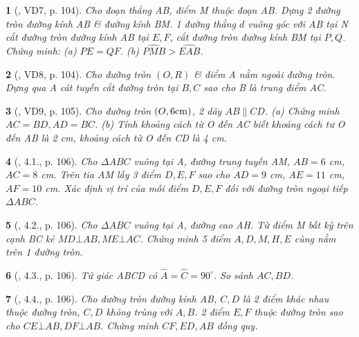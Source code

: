 \documentclass{article}
\newtheorem{baitoan}{}
\begin{document}
\begin{baitoan}[\cite{Binh_boi_duong_Toan_9_tap_1}, VD7, p. 104]
	Cho đoạn thẳng AB, điểm M thuộc đoạn AB. Dựng 2 đường tròn đường kính AB \& đường kính BM. 1 đường thẳng $d$ vuông góc với AB tại N cắt đường tròn đường kính AB tại $E,F$, cắt đường tròn đường kính BM tại $P,Q$. Chứng minh: (a) $PE = QF$. (b) $\widehat{PMB} > \widehat{EAB}$.
\end{baitoan}

\begin{baitoan}[\cite{Binh_boi_duong_Toan_9_tap_1}, VD8, p. 104]
	Cho đường tròn $(O,R)$ \& điểm A nằm ngoài đường tròn. Dựng qua A cát tuyến cắt đường tròn tại $B,C$ sao cho B là trung điểm AC.
\end{baitoan}

\begin{baitoan}[\cite{Binh_boi_duong_Toan_9_tap_1}, VD9, p. 105]
	Cho đường tròn $(O,6{\rm cm})$, 2 dây $AB\parallel CD$. (a) Chứng minh $AC = BD,AD = BC$. (b) Tính khoảng cách từ O đến AC biết khoảng cách tư O đến AB là {\rm2 cm}, khoảng cách từ O đến CD là {\rm4 cm}.
\end{baitoan}

\begin{baitoan}[\cite{Binh_boi_duong_Toan_9_tap_1}, 4.1., p. 106]
	Cho $\Delta ABC$ vuông tại A, đường trung tuyến AM, $AB = 6$ {\rm cm}, $AC = 8$ {\rm cm}. Trên tia AM lấy 3 điểm $D,E,F$ sao cho $AD = 9$ {\rm cm}, $AE = 11$ {\rm cm}, $AF = 10$ {\rm cm}. Xác định vị trí của mỗi điểm $D,E,F$ đối với đường tròn ngoại tiếp $\Delta ABC$.
\end{baitoan}

\begin{baitoan}[\cite{Binh_boi_duong_Toan_9_tap_1}, 4.2., p. 106]
	Cho $\Delta ABC$ vuông tại A, đường cao AH. Từ điểm M bất kỳ trên cạnh BC kẻ $MD\bot AB,ME\bot AC$. Chứng minh 5 điểm $A,D,M,H,E$ cùng nằm trên 1 đường tròn.
\end{baitoan}

\begin{baitoan}[\cite{Binh_boi_duong_Toan_9_tap_1}, 4.3., p. 106]
	Tứ giác ABCD có $\widehat{A} = \widehat{C} = 90^\circ$. So sánh $AC,BD$.
\end{baitoan}

\begin{baitoan}[\cite{Binh_boi_duong_Toan_9_tap_1}, 4.4., p. 106]
	Cho đường tròn đường kính AB, $C,D$ là 2 điểm khác nhau thuộc đường tròn, $C,D$ không trùng với $A,B$. 2 điểm $E,F$ thuộc đường tròn sao cho $CE\bot AB,DF\bot AB$. Chứng minh $CF,ED,AB$ đồng quy.
\end{baitoan}
\end{document}
